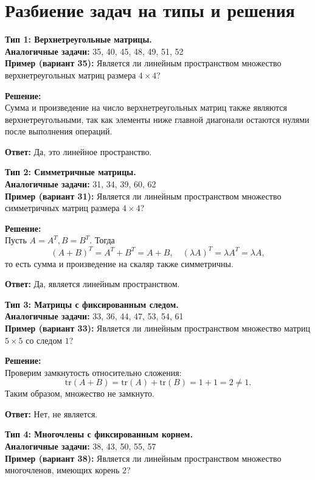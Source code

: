 \documentclass[a4paper,12pt]{article}
\begin{document}
\section*{Разбиение задач на типы и решения}

\textbf{Тип 1: Верхнетреугольные матрицы.} \\
\textbf{Аналогичные задачи:} 35, 40, 45, 48, 49, 51, 52\\
\textbf{Пример (вариант 35):} Является ли линейным пространством множество верхнетреугольных матриц размера \(4 \times 4\)?

\textbf{Решение:} \\
Сумма и произведение на число верхнетреугольных матриц также являются верхнетреугольными, так как элементы ниже главной диагонали остаются нулями после выполнения операций.

\textbf{Ответ:} Да, это линейное пространство.

\bigskip
\textbf{Тип 2: Симметричные матрицы.}\\
\textbf{Аналогичные задачи:} 31, 34, 39, 60, 62\\
\textbf{Пример (вариант 31):} Является ли линейным пространством множество симметричных матриц размера \(4\times4\)?

\textbf{Решение:} \\
Пусть \( A=A^T, B=B^T \). Тогда
\[
(A+B)^T = A^T+B^T = A+B, \quad (\lambda A)^T = \lambda A^T = \lambda A,
\]
то есть сумма и произведение на скаляр также симметричны.

\textbf{Ответ:} Да, является линейным пространством.

\bigskip
\textbf{Тип 3: Матрицы с фиксированным следом.}\\
\textbf{Аналогичные задачи:} 33, 36, 44, 47, 53, 54, 61\\
\textbf{Пример (вариант 33):} Является ли линейным пространством множество матриц \(5\times 5\) со следом \(1\)?

\textbf{Решение:}\\
Проверим замкнутость относительно сложения:
\[
\text{tr}(A+B) = \text{tr}(A)+\text{tr}(B) = 1+1=2\neq 1.
\]
Таким образом, множество не замкнуто.

\textbf{Ответ:} Нет, не является.

\bigskip
\textbf{Тип 4: Многочлены с фиксированным корнем.}\\
\textbf{Аналогичные задачи:} 38, 43, 50, 55, 57\\
\textbf{Пример (вариант 38):} Является ли линейным пространством множество многочленов, имеющих корень \(2\)?
\end{document}

